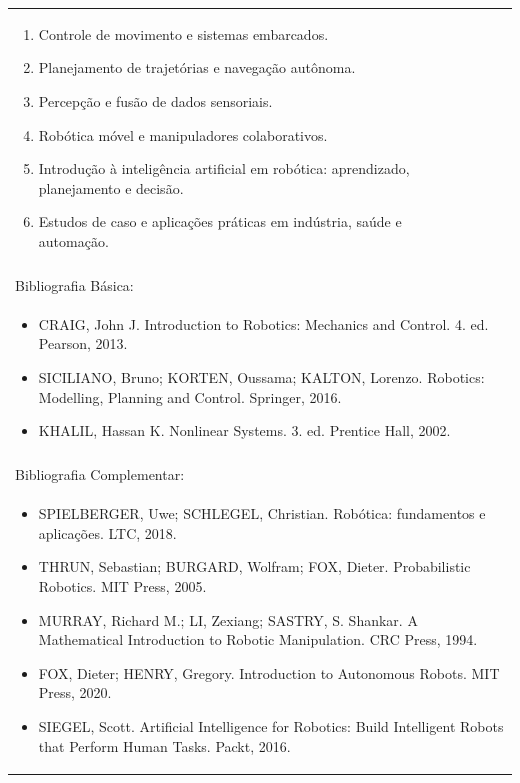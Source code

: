 \documentclass[11pt]{article}
\begin{document}
\begin{center}
\begin{longtable}{|p{4cm}|p{4cm}|p{4cm}|p{4cm}|}
{\begin{enumerate}
\item Controle de movimento e sistemas embarcados.
\item Planejamento de trajetórias e navegação autônoma.
\item Percepção e fusão de dados sensoriais.
\item Robótica móvel e manipuladores colaborativos.
\item Introdução à inteligência artificial em robótica: aprendizado, planejamento e decisão.
\item Estudos de caso e aplicações práticas em indústria, saúde e automação.\end{enumerate}}\\
\multicolumn{4}{|p{16cm}|}{}\\
\hline
\multicolumn{4}{|p{16cm}|}{Bibliografia Básica:}\\
\multicolumn{4}{|p{16cm}|}{%
\begin{itemize}\item CRAIG, John J. Introduction to Robotics: Mechanics and Control. 4. ed. Pearson, 2013.
\item SICILIANO, Bruno; KORTEN, Oussama; KALTON, Lorenzo. Robotics: Modelling, Planning and Control. Springer, 2016.
\item KHALIL, Hassan K. Nonlinear Systems. 3. ed. Prentice Hall, 2002.\end{itemize}}\\
\multicolumn{4}{|p{16cm}|}{}\\
\hline
\multicolumn{4}{|p{16cm}|}{Bibliografia Complementar:}\\
\multicolumn{4}{|p{16cm}|}{%
\begin{itemize}\item SPIELBERGER, Uwe; SCHLEGEL, Christian. Robótica: fundamentos e aplicações. LTC, 2018.
\item THRUN, Sebastian; BURGARD, Wolfram; FOX, Dieter. Probabilistic Robotics. MIT Press, 2005.
\item MURRAY, Richard M.; LI, Zexiang; SASTRY, S. Shankar. A Mathematical Introduction to Robotic Manipulation. CRC Press, 1994.
\item FOX, Dieter; HENRY, Gregory. Introduction to Autonomous Robots. MIT Press, 2020.
\item SIEGEL, Scott. Artificial Intelligence for Robotics: Build Intelligent Robots that Perform Human Tasks. Packt, 2016.\end{itemize}}\\
\hline
\end{longtable}
\end{center}
\end{document}
